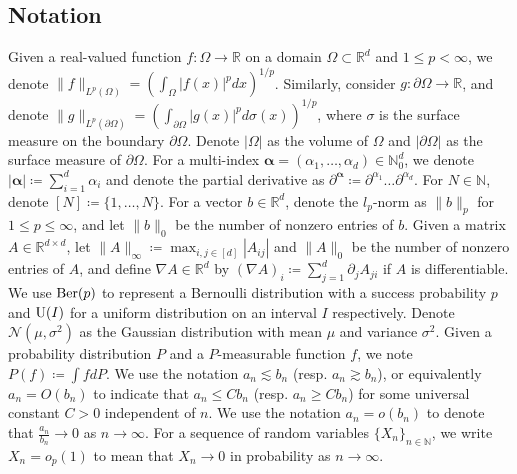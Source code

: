 \documentclass{article}
\newcommand{\R}{\mathbb{R}}
\newcommand{\N}{\mathcal{N}}
\theoremstyle{plain}
\theoremstyle{definition}
\theoremstyle{remark}
\begin{document}
\subsection{Notation}
 Given a real-valued function $f: \Omega \to \R$ on a domain $\Omega \subset \R^d$ and $1 \leq p < \infty$, we denote $\|f\|_{L^p(\Omega)} = (\int_\Omega |f(x)|^p dx)^{1/p}$. Similarly, consider $g: \partial \Omega \to \R$, and denote $\|g\|_{L^p(\partial \Omega)} = (\int_{\partial \Omega} |g(x)|^p d\sigma(x))^{1/p}$, where $\sigma$ is the surface measure on the boundary $\partial \Omega$. Denote $|\Omega|$ as the volume of $\Omega$ and $|\partial \Omega|$ as the surface measure of $\partial \Omega$. For a multi-index $\bm{\alpha} = (\alpha_1, \ldots, \alpha_d) \in \mathbb{N}_0^{d}$, we denote $|\bm{\alpha}| \coloneqq \sum_{i=1}^d \alpha_i$ and denote the partial derivative as $\partial^{\bm{\alpha}} \coloneqq \partial^{\alpha_1} \ldots \partial^{\alpha_d}$. For $N \in \mathbb{N}$, denote $[N] \coloneqq \{1, \ldots, N\}$. For a vector $b \in \R^d$, denote the $l_p$-norm as $\|b\|_p$ for $1 \leq p \leq \infty$, and let $\|b\|_0$ be the number of nonzero entries of $b$. Given a matrix $A \in \R^{d \times d}$, let $\|A\|_\infty \coloneqq \max_{i, j \in [d]} |A_{ij}|$ and $\|A\|_0$ be the number of nonzero entries of $A$, and define $\nabla A \in \R^d$ by $(\nabla A)_i \coloneqq \sum_{j=1}^d \partial_j A_{ji}$ if $A$ is differentiable. We use $\textnormal{Ber}(p)$ to represent a Bernoulli distribution with a success probability $p$ and $\textnormal{U} (I)$ for a uniform distribution on an interval $I$ respectively. Denote $\N(\mu, \sigma^2)$ as the Gaussian distribution with mean $\mu$ and variance $\sigma^2$. Given a probability distribution $P$ and a $P$-measurable function $f$, we note $P(f) \coloneqq  \int f dP$. We use the notation $a_n \lesssim b_n$ (resp. $a_n \gtrsim b_n$), or equivalently $a_n = O(b_n)$ to indicate that $a_n \leq C b_n$ (resp. $a_n \geq C b_n$) for some universal constant $C > 0$ independent of $n$. We use the notation $a_n = o(b_n)$ to denote that $\frac{a_n}{b_n} \rightarrow 0$ as $n \rightarrow \infty$. For a sequence of random variables $\{X_n\}_{n \in \mathbb{N}}$, we write $X_n = o_p(1)$ to mean that $X_n \rightarrow 0$ in probability as $n \rightarrow \infty$. 
\end{document}
